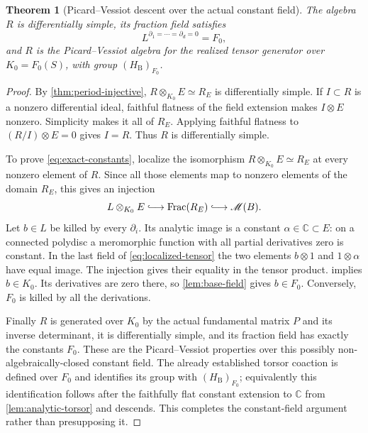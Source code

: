 \documentclass[11pt]{article}
\numberwithin{equation}{section}
\newtheorem{theorem}{Theorem}[section]
\theoremstyle{definition}
\theoremstyle{remark}
\newcommand{\C}{\mathbb C}
\newcommand{\Frac}{\operatorname{Frac}}
\newcommand{\B}{\mathrm B}
\begin{document}
\begin{theorem}[Picard--Vessiot descent over the actual constant field]\label{thm:pv-descent}
The algebra $R$ is differentially simple, its fraction field satisfies
\begin{equation}\label{eq:exact-constants}
 L^{\partial_1=\cdots=\partial_d=0}=F_0,
\end{equation}
and $R$ is the Picard--Vessiot algebra for the realized tensor generator
over $K_0=F_0(S)$, with group $(H_\B)_{F_0}$.
\end{theorem}
\begin{proof}
By \cref{thm:period-injective},
$R\otimes_{K_0}E\simeq R_E$ is differentially simple. If $I\subset R$
is a nonzero differential ideal, faithful flatness of the field extension
makes $I\otimes E$ nonzero. Simplicity makes it all of $R_E$.
Applying faithful flatness to $(R/I)\otimes E=0$ gives $I=R$.
Thus $R$ is differentially simple.

To prove \eqref{eq:exact-constants}, localize the isomorphism
$R\otimes_{K_0}E\simeq R_E$ at every nonzero element of $R$. Since
all those elements map to nonzero elements of the domain $R_E$, this gives
an injection
\begin{equation}\label{eq:localized-tensor}
 L\otimes_{K_0}E\lhook\joinrel\longrightarrow\Frac(R_E)
 \lhook\joinrel\longrightarrow\mathscr M(B).
\end{equation}
Let $b\in L$ be killed by every $\partial_i$. Its analytic image is a
constant $\alpha\in\C\subset E$: on a connected polydisc a meromorphic
function with all partial derivatives zero is constant. In the last field
of \eqref{eq:localized-tensor} the two elements $b\otimes1$ and
$1\otimes\alpha$ have equal image. The injection gives their equality
in the tensor product.  implies $b\in K_0$.
Its derivatives are zero there, so \cref{lem:base-field} gives
$b\in F_0$. Conversely, $F_0$ is killed by all the derivations.

Finally $R$ is generated over $K_0$ by the actual fundamental matrix
$P$ and its inverse determinant, it is differentially simple, and its
fraction field has exactly the constants $F_0$. These are the
Picard--Vessiot properties over this possibly non-algebraically-closed
constant field. The already established torsor coaction is defined over
$F_0$ and identifies its group with $(H_\B)_{F_0}$; equivalently this
identification follows after the faithfully flat constant extension to
$\C$ from \cref{lem:analytic-torsor} and descends. This completes the
constant-field argument rather than presupposing it.
\end{proof}
\end{document}
